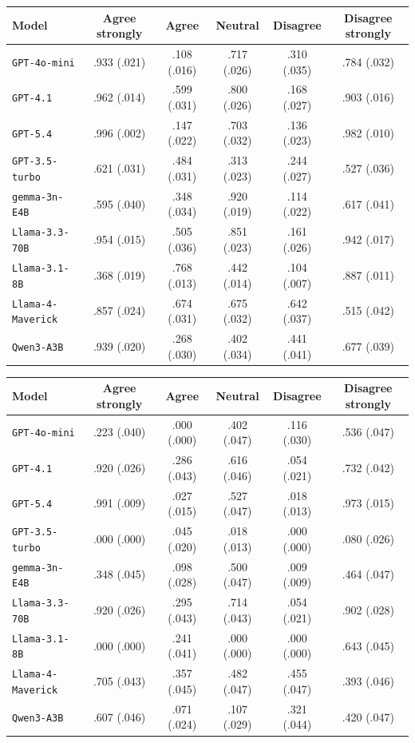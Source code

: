 \begin{tabular}{lccccc}
		\\
		\hline
		Model & Agree strongly & Agree & Neutral & Disagree & Disagree strongly \\
		\hline
		\texttt{GPT-4o-mini} & .933 (.021) & .108 (.016) & .717 (.026) & .310 (.035) & .784 (.032) \\
		\texttt{GPT-4.1} & .962 (.014) & .599 (.031) & .800 (.026) & .168 (.027) & .903 (.016) \\
		\texttt{GPT-5.4} & .996 (.002) & .147 (.022) & .703 (.032) & .136 (.023) & .982 (.010) \\
		\texttt{GPT-3.5-turbo} & .621 (.031) & .484 (.031) & .313 (.023) & .244 (.027) & .527 (.036) \\
		\texttt{gemma-3n-E4B} & .595 (.040) & .348 (.034) & .920 (.019) & .114 (.022) & .617 (.041) \\
		\texttt{Llama-3.3-70B} & .954 (.015) & .505 (.036) & .851 (.023) & .161 (.026) & .942 (.017) \\
		\texttt{Llama-3.1-8B} & .368 (.019) & .768 (.013) & .442 (.014) & .104 (.007) & .887 (.011) \\
		\texttt{Llama-4-Maverick} & .857 (.024) & .674 (.031) & .675 (.032) & .642 (.037) & .515 (.042) \\
		\texttt{Qwen3-A3B} & .939 (.020) & .268 (.030) & .402 (.034) & .441 (.041) & .677 (.039) \\
		\hline
\end{tabular}


\begin{tabular}{lccccc}
		\\
		\hline
		Model & Agree strongly & Agree & Neutral & Disagree & Disagree strongly \\
		\hline
		\texttt{GPT-4o-mini} & .223 (.040) & .000 (.000) & .402 (.047) & .116 (.030) & .536 (.047) \\
		\texttt{GPT-4.1} & .920 (.026) & .286 (.043) & .616 (.046) & .054 (.021) & .732 (.042) \\
		\texttt{GPT-5.4} & .991 (.009) & .027 (.015) & .527 (.047) & .018 (.013) & .973 (.015) \\
		\texttt{GPT-3.5-turbo} & .000 (.000) & .045 (.020) & .018 (.013) & .000 (.000) & .080 (.026) \\
		\texttt{gemma-3n-E4B} & .348 (.045) & .098 (.028) & .500 (.047) & .009 (.009) & .464 (.047) \\
		\texttt{Llama-3.3-70B} & .920 (.026) & .295 (.043) & .714 (.043) & .054 (.021) & .902 (.028) \\
		\texttt{Llama-3.1-8B} & .000 (.000) & .241 (.041) & .000 (.000) & .000 (.000) & .643 (.045) \\
		\texttt{Llama-4-Maverick} & .705 (.043) & .357 (.045) & .482 (.047) & .455 (.047) & .393 (.046) \\
		\texttt{Qwen3-A3B} & .607 (.046) & .071 (.024) & .107 (.029) & .321 (.044) & .420 (.047) \\
		\hline
\end{tabular}



